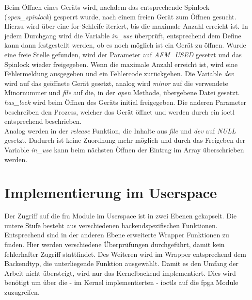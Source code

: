 Beim Öffnen eines Geräts wird, nachdem das entsprechende Spinlock (\textit{open\_spinlock}) gesperrt wurde, nach einem freien Gerät zum Öffnen gesucht. Hierzu wird über eine for-Schleife iteriert, bis die maximale Anzahl erreicht ist. In jedem Durchgang wird die Variable \textit{in\_use} überprüft, entsprechend dem Define kann dann festgestellt werden, ob es noch möglich ist ein Gerät zu öffnen. Wurde eine freie Stelle gefunden, wird der Parameter auf \textit{AFM\_USED} gesetzt und das Spinlock wieder freigegeben.
Wenn die maximale Anzahl erreicht ist, wird eine Fehlermeldung ausgegeben und ein Fehlercode zurückgehen.
Die Variable \textit{dev} wird auf das geöffnete Gerät gesetzt, analog wird \textit{minor} auf die verwendete Minornummer und \textit{file} auf die, in der \textit{open} Methode, übergebene Datei gesetzt. 
\textit{has\_lock} wird beim Öffnen des Geräts initial freigegeben. Die anderen Parameter beschreiben den Prozess, welcher das Gerät öffnet und werden durch ein \ac{ioctl} entsprechend beschrieben.\\

Analog werden in der \textit{release} Funktion, die Inhalte aus \textit{file} und \textit{dev} auf \textit{NULL} gesetzt. Dadurch ist keine Zuordnung mehr möglich und durch das Freigeben der Variable \textit{in\_use} kann beim nächsten Öffnen der Eintrag im Array überschrieben werden.


\section{Implementierung im Userspace}\label{sec:user}
Der Zugriff auf die \ac{fra} Module im Userspace ist in zwei Ebenen gekapselt. Die untere Stufe besteht aus verschiedenen backendspezifischen Funktionen. Entsprechend sind in der anderen Ebene erweiterte Wrapper Funktionen zu finden. Hier werden verschiedene Überprüfungen durchgeführt, damit kein fehlerhafter Zugriff stattfindet. Des Weiteren wird im Wrapper entsprechend dem Backendtyp, die unterliegende Funktion ausgewählt. Damit es den Umfang der Arbeit nicht übersteigt, wird nur das Kernelbackend implementiert. Dies wird benötigt um über die - im Kernel implementierten - \ac{ioctl}s auf die \ac{fpga} Module zuzugreifen. 

